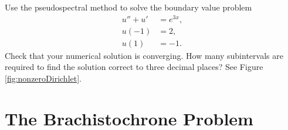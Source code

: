\begin{problem}
Use the pseudospectral method to solve the boundary value problem 
\begin{align*}
u'' + u' &= e^{3x}, \\
u(-1) &= 2, \\
u(1) &= -1.
\end{align*}
Check that your numerical solution is converging.
How many subintervals are required to find the solution correct to three decimal places?
See Figure \ref{fig:nonzeroDirichlet}.
	
\end{problem}





\section*{The Brachistochrone Problem}












